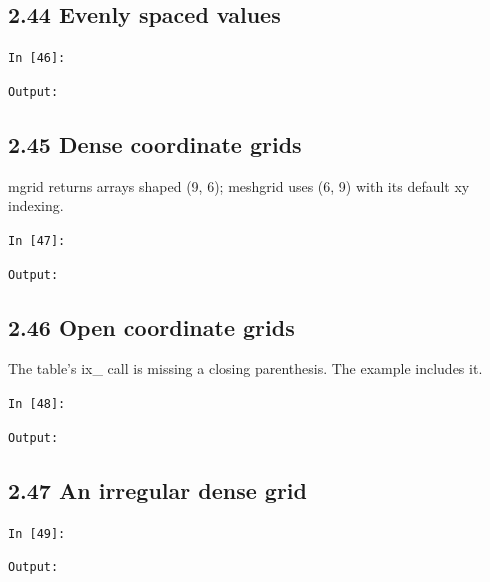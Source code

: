 \documentclass[11pt]{article}
\begin{document}
\par\medskip\noindent\begin{minipage}{\linewidth}
\subsection*{2.44 Evenly spaced values}
\noindent\texttt{In [46]:}

\noindent\texttt{Output:}

\end{minipage}\par

\par\medskip\noindent\begin{minipage}{\linewidth}
\subsection*{2.45 Dense coordinate grids}
mgrid returns arrays shaped (9, 6); meshgrid uses (6, 9) with its default xy indexing.

\noindent\texttt{In [47]:}

\noindent\texttt{Output:}

\end{minipage}\par

\par\medskip\noindent\begin{minipage}{\linewidth}
\subsection*{2.46 Open coordinate grids}
The table's ix\_ call is missing a closing parenthesis. The example includes it.

\noindent\texttt{In [48]:}

\noindent\texttt{Output:}

\end{minipage}\par

\par\medskip\noindent\begin{minipage}{\linewidth}
\subsection*{2.47 An irregular dense grid}
\noindent\texttt{In [49]:}

\noindent\texttt{Output:}

\end{minipage}\par
\end{document}
